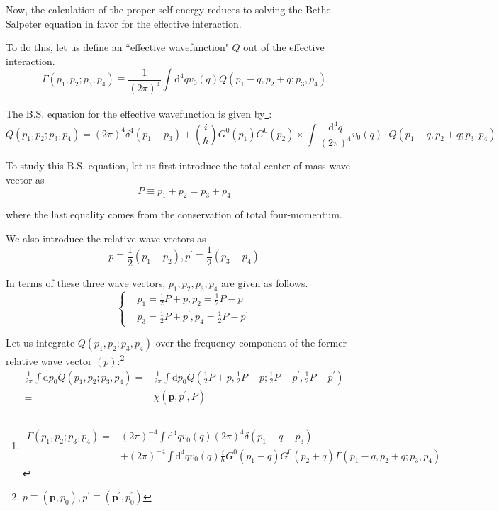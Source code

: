 Now, the calculation of the proper self energy reduces to solving the Bethe-Salpeter equation in favor for the effective interaction.

To do this, let us define an ``effective wavefunction" $Q$ out of the effective interaction.
\begin{equation} \label{Eqs2.7.7}
\Gamma(p_1,p_2;p_3,p_4) \equiv \frac{1}{(2\pi)^4} \int \mathrm{d}^4 q v_0(q) Q(p_1-q,p_2+q;p_3,p_4)
\end{equation}

The B.S. equation for the effective wavefunction is given by\footnote{\[ \begin{split} \Gamma(p_1,p_2;p_3,p_4) =& (2\pi)^{-4} \int \mathrm{d}^4 q v_0(q) (2\pi)^4 \delta(p_1-q-p_3) \\&+ (2\pi)^{-4} \int \mathrm{d}^4 q v_0(q) \frac{i}{\hbar}G^0(p_1-q)G^0(p_2+q)\Gamma(p_1-q,p_2+q;p_3,p_4) \end{split} \]}:
\begin{equation} \label{Eqs2.7.8}
Q(p_1,p_2;p_3,p_4) = (2\pi)^4 \delta^4(p_1-p_3) + \left(\frac{i}{\hbar}\right) G^0(p_1)G^0(p_2) \times \int \frac{\mathrm{d}^4 q}{(2\pi)^4} v_0(q)\cdot Q(p_1-q,p_2+q;p_3,p_4)
\end{equation}

To study this B.S. equation, let us first introduce the total center of mass wave vector as
\begin{equation} \label{Eqs2.7.9} P \equiv p_1+p_2 = p_3 + p_4 \end{equation}

where the last equality comes from the conservation of total four-momentum.

We also introduce the relative wave vectors as
\begin{equation} \label{Eqs2.7.10} p \equiv \frac{1}{2}(p_1-p_2), p^{'} \equiv \frac{1}{2}(p_3-p_4) \end{equation}

In terms of these three wave vectors, $p_1,p_2,p_3,p_4$ are given as follows.
\begin{equation} \label{Eqs2.7.11} \left \{ \begin{aligned} &p_1 = \frac{1}{2}P+p, p_2 = \frac{1}{2}P-p \\ &p_3 = \frac{1}{2}P+p^{'} , p_4 = \frac{1}{2}P-p^{'}
\end{aligned} \right. \end{equation}

Let us integrate $Q(p_1,p_2;p_3,p_4)$ over the frequency component of the former relative wave vector $(p)$:\footnote{$p \equiv (\mathbf{p},p_0), p^{'} \equiv (\mathbf{p}^{'},p_0^{'})$}
\begin{equation} \label{2.7.12} \begin{split}
\frac{1}{2\pi} \int \mathrm{d}p_0 Q(p_1,p_2;p_3,p_4) =
& \frac{1}{2\pi} \int \mathrm{d}p_0 Q(\frac{1}{2}P+p,\frac{1}{2}P-p;\frac{1}{2}P+p^{'},\frac{1}{2}P-p^{'})\\
\equiv & \chi(\mathbf{p},p^{'},P)
\end{split}\end{equation}

